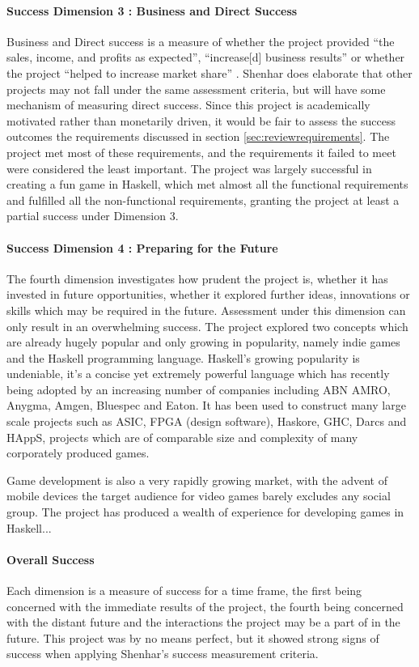 \paragraph{Success Dimension 3 : Business and Direct Success}
Business and Direct success is a measure of whether the project provided ``the sales, income, and profits as expected'', ``increase[d] business results'' or whether the project ``helped to increase market share'' \cite{shenhar}. Shenhar does elaborate that other projects may not fall under the same assessment criteria, but will have some mechanism of measuring direct success. Since this project is academically motivated rather than monetarily driven, it would be fair to assess the success outcomes the requirements discussed in section \ref{sec:reviewrequirements}. The project met most of these requirements, and the requirements it failed to meet were considered the least important. The project was largely successful in creating a fun game in Haskell, which met almost all the functional requirements and fulfilled all the non-functional requirements, granting the project at least a partial success under Dimension 3.
 
\paragraph{Success Dimension 4 : Preparing for the Future}
The fourth dimension investigates how prudent the project is, whether it has invested in future opportunities, whether it explored further ideas, innovations or skills which may be required in the future. Assessment under this dimension can only result in an overwhelming success. The project explored two concepts which are already hugely popular and only growing in popularity, namely indie games and the Haskell programming language. Haskell's growing popularity is undeniable, it's a concise yet extremely powerful language which has recently being adopted by an increasing number of companies including ABN AMRO, Anygma, Amgen, Bluespec and Eaton. It has been used to construct many large scale projects such as ASIC, FPGA (design software), Haskore, GHC, Darcs and HAppS, projects which are of comparable size and complexity of many corporately produced games. \cite{realworldhaskell}

Game development is also a very rapidly growing market, with the advent of mobile devices the target audience for video games barely excludes any social group.  
The project has produced a wealth of experience for developing games in Haskell...

\paragraph{Overall Success}
Each dimension is a measure of success for a time frame, the first being concerned with the immediate results of the project, the fourth being concerned with the distant future and the interactions the project may be a part of in the future. This project was by no means perfect, but it showed strong signs of success when applying Shenhar's success measurement criteria.

